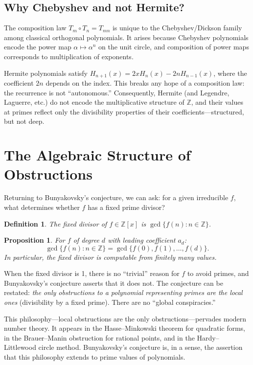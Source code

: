 \documentclass[11pt,a4paper]{article}
\newtheorem{proposition}[theorem]{Proposition}
\newtheorem{definition}[theorem]{Definition}
\newcommand{\Z}{\mathbb{Z}}
\begin{document}
\subsection{Why Chebyshev and not Hermite?}

The composition law $T_m \circ T_n = T_{mn}$ is unique to the Chebyshev/Dickson family among classical orthogonal polynomials. It arises because Chebyshev polynomials encode the power map $\alpha \mapsto \alpha^n$ on the unit circle, and composition of power maps corresponds to multiplication of exponents.

Hermite polynomials satisfy $H_{n+1}(x) = 2xH_n(x) - 2nH_{n-1}(x)$, where the coefficient $2n$ depends on the index. This breaks any hope of a composition law: the recurrence is not ``autonomous.'' Consequently, Hermite (and Legendre, Laguerre, etc.) do not encode the multiplicative structure of $\Z$, and their values at primes reflect only the divisibility properties of their coefficients---structured, but not deep.

\section{The Algebraic Structure of Obstructions}

Returning to Bunyakovsky's conjecture, we can ask: for a given irreducible $f$, what determines whether $f$ has a fixed prime divisor?

\begin{definition}
The \emph{fixed divisor} of $f \in \Z[x]$ is $\gcd\{f(n) : n \in \Z\}$.
\end{definition}

\begin{proposition}
For $f$ of degree $d$ with leading coefficient $a_d$:
\[
    \gcd\{f(n) : n \in \Z\} = \gcd\{f(0), f(1), \ldots, f(d)\}.
\]
In particular, the fixed divisor is computable from finitely many values.
\end{proposition}

When the fixed divisor is 1, there is no ``trivial'' reason for $f$ to avoid primes, and Bunyakovsky's conjecture asserts that it does not. The conjecture can be restated: \emph{the only obstructions to a polynomial representing primes are the local ones} (divisibility by a fixed prime). There are no ``global conspiracies.''

This philosophy---local obstructions are the only obstructions---pervades modern number theory. It appears in the Hasse--Minkowski theorem for quadratic forms, in the Brauer--Manin obstruction for rational points, and in the Hardy--Littlewood circle method. Bunyakovsky's conjecture is, in a sense, the assertion that this philosophy extends to prime values of polynomials.
\end{document}
